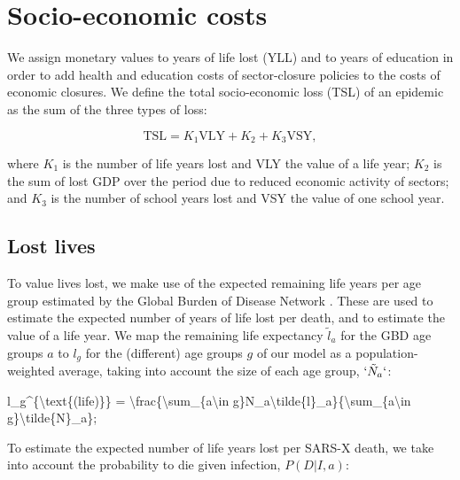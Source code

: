 \documentclass[
]{article}
\newenvironment{Shaded}{\begin{snugshade}}{\end{snugshade}}
\newcommand{\NormalTok}[1]{#1}
\begin{document}
\section{Socio-economic costs}\label{socio-economic-costs}

We assign monetary values to years of life lost (YLL) and to years of education in order to add health and education costs of sector-closure policies to the costs of economic closures. We define the total socio-economic loss (TSL) of an epidemic as the sum of the three types of loss:

\begin{equation}
\text{TSL} = K_1\text{VLY} + K_2 + K_3\text{VSY},
\label{eq:swf}
\end{equation}

where \(K_1\) is the number of life years lost and VLY the value of a life year; \(K_2\) is the sum of lost GDP over the period due to reduced economic activity of sectors; and \(K_3\) is the number of school years lost and VSY the value of one school year.

\subsection{Lost lives}\label{lost-lives}

To value lives lost, we make use of the expected remaining life years per age group estimated by the Global Burden of Disease Network \citep{GlobalBurdenofDiseaseCollaborativeNetwork2021}. These are used to estimate the expected number of years of life lost per death, and to estimate the value of a life year. We map the remaining life expectancy \(\tilde{l}_a\) for the GBD age groups \(a\) to \(l_g\) for the (different) age groups \(g\) of our model as a population-weighted average, taking into account the size of each age group, \(`\tilde{N}_a`\):

\begin{Shaded}
\begin{Highlighting}[]
\NormalTok{l\_g\^{}\{\textbackslash{}text\{(life)\}\} = \textbackslash{}frac\{\textbackslash{}sum\_\{a\textbackslash{}in g\}N\_a\textbackslash{}tilde\{l\}\_a\}\{\textbackslash{}sum\_\{a\textbackslash{}in g\}\textbackslash{}tilde\{N\}\_a\}; }
\end{Highlighting}
\end{Shaded}

To estimate the expected number of life years lost per SARS-X death, we take into account the probability to die given infection, \(P(D|I,a)\):
\end{document}
